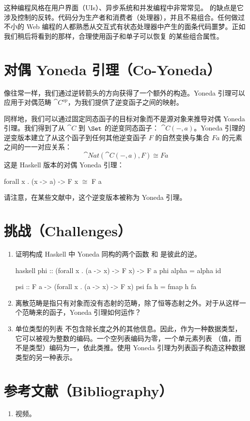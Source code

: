 这种编程风格在用户界面（UIs）、异步系统和并发编程中非常常见。 的缺点是它涉及控制的反转。代码分为生产者和消费者（处理器），并且不易组合。任何做过不小的 Web 编程的人都熟悉从交互式有状态处理器中产生的面条代码噩梦。正如我们稍后将看到的那样，合理使用函子和单子可以恢复  的某些组合属性。

\section{对偶 Yoneda 引理（Co-Yoneda）}

像往常一样，我们通过逆转箭头的方向获得了一个额外的构造。Yoneda 引理可以应用于对偶范畴 $\cat{C}^\mathit{op}$，为我们提供了逆变函子之间的映射。

同样地，我们可以通过固定同态函子的目标对象而不是源对象来推导对偶 Yoneda 引理。我们得到了从 $\cat{C}$ 到 $\Set$ 的逆变同态函子：
$\cat{C}(-, a)$。Yoneda 引理的逆变版本建立了从这个函子到任何其他逆变函子 $F$ 的自然变换与集合 $F a$ 的元素之间的一一对应关系：
\[\cat{Nat}(\cat{C}(-, a), F) \cong F a\]
这是 Haskell 版本的对偶 Yoneda 引理：

\begin{snipv}
  forall x . (x -> a) -> F x \ensuremath{\cong} F a
\end{snipv}
请注意，在某些文献中，这个逆变版本被称为 Yoneda 引理。

\section{挑战（Challenges）}

\begin{enumerate}
  \tightlist
  \item
  证明构成 Haskell 中 Yoneda 同构的两个函数  和  是彼此的逆。

  \begin{snip}{haskell}
    phi :: (forall x . (a -> x) -> F x) -> F a
    phi alpha = alpha id

    psi :: F a -> (forall x . (a -> x) -> F x)
    psi fa h = fmap h fa
  \end{snip}
  \item
  离散范畴是指只有对象而没有态射的范畴，除了恒等态射之外。对于从这样一个范畴来的函子，Yoneda 引理如何运作？
  \item
  单位类型的列表 \code{{[}(){]}} 不包含除长度之外的其他信息。因此，作为一种数据类型，它可以被视为整数的编码。一个空列表编码为零，一个单元素列表 \code{{[}(){]}}（值，而不是类型）编码为一，依此类推。使用 Yoneda 引理为列表函子构造这种数据类型的另一种表示。
\end{enumerate}

\section{参考文献（Bibliography）}

\begin{enumerate}
  \tightlist
  \item
   视频。
\end{enumerate}
